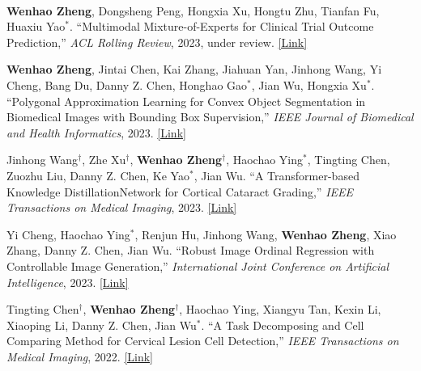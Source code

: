 
\begin{cventries}

    \cventry
    {} %
    {\ } %
    {\ } %
    {} %
    {
        \vspace{-8mm}
        \begin{cvitemize2}
            \item \textbf{Wenhao Zheng}, Dongsheng Peng, Hongxia Xu, Hongtu Zhu, Tianfan Fu, Huaxiu Yao$^*$. ``Multimodal Mixture-of-Experts for Clinical Trial Outcome Prediction,'' \textit{ACL Rolling Review}, 2023, under review. \href{https://openreview.net/forum?id=lij88o8f6Fb}{\textcolor{link}{[Link]}}
            \vspace{1mm}
            \item \textbf{Wenhao Zheng}, Jintai Chen, Kai Zhang, Jiahuan Yan, Jinhong Wang, Yi Cheng, Bang Du, Danny Z. Chen, Honghao Gao$^*$, Jian Wu, Hongxia Xu$^*$. ``Polygonal Approximation Learning for Convex Object Segmentation in Biomedical Images with Bounding Box Supervision,'' \textit{IEEE Journal of Biomedical and Health Informatics}, 2023. \href{https://ieeexplore.ieee.org/document/10354298}{\textcolor{link}{[Link]}}
            \vspace{1mm}
            \item Jinhong Wang$^\dagger$, Zhe Xu$^\dagger$, \textbf{Wenhao Zheng$^\dagger$}, Haochao Ying$^*$, Tingting Chen, Zuozhu Liu, Danny Z. Chen, Ke Yao$^*$, Jian Wu. ``A Transformer-based Knowledge DistillationNetwork for Cortical Cataract Grading,'' \textit{IEEE Transactions on Medical Imaging}, 2023. \href{https://ieeexplore.ieee.org/abstract/document/10294274}{\textcolor{link}{[Link]}}
            \vspace{1mm}
            \item Yi Cheng, Haochao Ying$^*$, Renjun Hu, Jinhong Wang, \textbf{Wenhao Zheng}, Xiao Zhang, Danny Z. Chen, Jian Wu. ``Robust Image Ordinal Regression with Controllable Image Generation,'' \textit{International Joint Conference on Artificial Intelligence}, 2023. \href{https://arxiv.org/abs/2305.04213}{\textcolor{link}{[Link]}}
            \vspace{1mm}
            \item Tingting Chen$^\dagger$, \textbf{Wenhao Zheng$^\dagger$}, Haochao Ying, Xiangyu Tan, Kexin Li, Xiaoping Li, Danny Z. Chen, Jian Wu$^*$. ``A Task Decomposing and Cell Comparing Method for Cervical Lesion Cell Detection,'' \textit{IEEE Transactions on Medical Imaging}, 2022. \href{https://ieeexplore.ieee.org/document/9744114}{\textcolor{link}{[Link]}}

\end{cvitemize2}}
\end{cventries}
